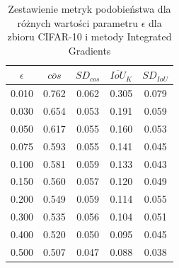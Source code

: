 \begin{table}[H]
    \centering
    \caption{Zestawienie metryk podobieństwa dla różnych wartości parametru \(\epsilon\) dla zbioru CIFAR-10 i metody Integrated Gradients}
    \label{tab:ig_fgsm_cos_topk_cifar10}
    \begin{tabular}{ccccc}
    \toprule
    $\epsilon$ & $\overline{cos}$ & $SD_{cos}$ & $\overline{IoU}_{K}$ & $SD_{IoU}$ \\
    \midrule
    0.010 & 0.762 & 0.062 & 0.305 & 0.079 \\
    0.030 & 0.654 & 0.053 & 0.191 & 0.059 \\
    0.050 & 0.617 & 0.055 & 0.160 & 0.053 \\
    0.075 & 0.593 & 0.055 & 0.141 & 0.045 \\
    0.100 & 0.581 & 0.059 & 0.133 & 0.043 \\
    0.150 & 0.560 & 0.057 & 0.120 & 0.049 \\
    0.200 & 0.549 & 0.059 & 0.114 & 0.055 \\
    0.300 & 0.535 & 0.056 & 0.104 & 0.051 \\
    0.400 & 0.520 & 0.050 & 0.095 & 0.045 \\
    0.500 & 0.507 & 0.047 & 0.088 & 0.038 \\
    \bottomrule
    \end{tabular}
\end{table}

